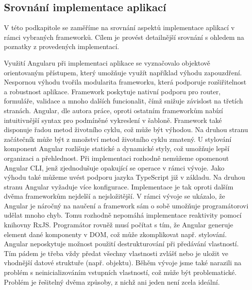 \begin{zvyraznenyodstavec}
\subsection{Srovnání implementace aplikací}

V této podkapitole se zaměříme na srovnání aspektů implementace aplikací v rámci vybraných frameworků. 
Cílem je provést detailnější srovnání s ohledem na poznatky z provedených implementací. 

Využití Angularu při implementaci aplikace se vyznačovalo objektově orientovaným přístupem, který umožňuje využít například výhodu zapouzdření. 
Nespornou výhodu tvořila modularita frameworku, která podporuje rozšiřitelnost a robustnost aplikace. 
Framework poskytuje nativní podporu pro router, formuláře, validace a mnoho dalších funcionalit, čímž snižuje závislost na třetích stranách. 
Angular, dle autora práce, oproti ostatním frameworkům nabízí intuitivnější syntax pro podmíněné vykreslení v šabloně. 
Framework také disponuje řadou metod životního cyklu, což může být výhodou. Na druhou stranu začátečník může být z množství metod životního cyklu zmatený. 
U stylování komponent Angular rozlišuje statické a dynamické styly, což umožňuje lepší organizaci a přehlednost. 
Při implementaci rozhodně nemůžeme opomenout Angular CLI, jenž zjednodušuje opakující se operace v rámci vývoje. 
Jako výhodu také můžeme uvést podporu jazyka TypeScript již v základu. 
Na druhou stranu Angular vyžaduje více konfigurace. Implementace je tak oproti dalším dvěma frameworkům nejdelší a nejsložitější. 
V rámci vývoje se ukázalo, že Angular je náročný na naučení a framework sám o sobě umožňuje programátorovi udělat mnoho chyb. 
Tomu rozhodně nepomáhá implementace reaktivity pomocí knihovny RxJS. 
Programátor rovněž musí počítat s tím, že Angular generuje element dané komponenty v DOM, což může zkomplikovat např. stylování. 
Angular neposkytuje možnost použití destrukturování při předávání vlastností. 
Tím pádem je třeba vždy předat všechny vlastnosti zvlášť nebo je uložit ve vhodnější datové struktuře (např. objektu).
Běhěm vývoje jsme také narazili na problém s neinicializováním vstupních vlastností, což může být problematické. 
Problém je řešitelný dvěma způsoby, z nichž ani jeden není zcela ideální.



\end{zvyraznenyodstavec}
